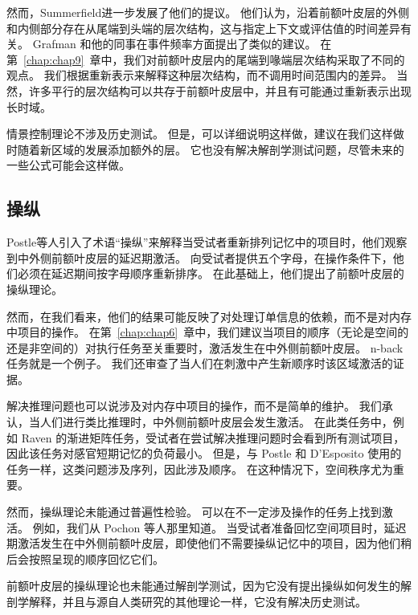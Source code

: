 然而，Summerfield\cite{summerfield2009decision}进一步发展了他们的提议。
他们认为，沿着前额叶皮层的外侧和内侧部分存在从尾端到头端的层次结构，这与指定上下文或评估值的时间差异有关。
Grafman 和他的同事\cite{krueger2007event}在事件频率方面提出了类似的建议。
在第~\ref{chap:chap9}~章中，我们对前额叶皮层内的尾端到喙端层次结构采取了不同的观点。
我们根据重新表示来解释这种层次结构，而不调用时间范围内的差异。
当然，许多平行的层次结构可以共存于前额叶皮层中，并且有可能通过重新表示出现长时域。
\par


情景控制理论不涉及历史测试。
但是，可以详细说明这样做，建议在我们这样做时随着新区域的发展添加额外的层。
它也没有解决解剖学测试问题，尽管未来的一些公式可能会这样做。



\subsection{操纵}

Postle等人\cite{postle1999functional}引入了术语“操纵”来解释当受试者重新排列记忆中的项目时，他们观察到中外侧前额叶皮层的延迟期激活。
向受试者提供五个字母，在操作条件下，他们必须在延迟期间按字母顺序重新排序。
在此基础上，他们提出了前额叶皮层的操纵理论。
\par


然而，在我们看来，他们的结果可能反映了对处理订单信息的依赖，而不是对内存中项目的操作。
在第~\ref{chap:chap6}~章中，我们建议当项目的顺序（无论是空间的还是非空间的）对执行任务至关重要时，激活发生在中外侧前额叶皮层。
n-back 任务就是一个例子。 我们还审查了当人们在刺激中产生新顺序时该区域激活的证据。
\par


解决推理问题也可以说涉及对内存中项目的操作，而不是简单的维护。
我们承认，当人们进行类比推理时，中外侧前额叶皮层会发生激活\cite{prabhakaran1997neural}。
在此类任务中，例如 Raven 的渐进矩阵任务，受试者在尝试解决推理问题时会看到所有测试项目，因此该任务对感官短期记忆的负荷最小。
但是，与 Postle 和 D'Esposito 使用的任务一样，这类问题涉及序列，因此涉及顺序。
在这种情况下，空间秩序尤为重要。
\par


然而，操纵理论未能通过普遍性检验。
可以在不一定涉及操作的任务上找到激活。 例如，我们从 Pochon 等人那里知道\cite{pochon2001role}。
当受试者准备回忆空间项目时，延迟期激活发生在中外侧前额叶皮层，即使他们不需要操纵记忆中的项目，因为他们稍后会按照呈现的顺序回忆它们。
\par


前额叶皮层的操纵理论也未能通过解剖学测试，因为它没有提出操纵如何发生的解剖学解释，并且与源自人类研究的其他理论一样，它没有解决历史测试。



